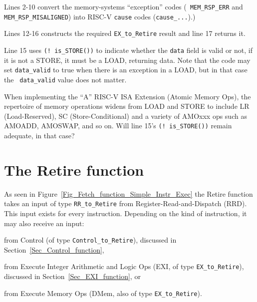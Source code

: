 Lines 2-10 convert the memory-systems ``exception'' codes ({\tt
MEM\_RSP\_ERR} and {\tt MEM\_RSP\_MISALIGNED}) into RISC-V {\tt cause}
codes ({\tt cause\_...}).)

Lines 12-16 constructs the required {\tt EX\_to\_Retire} result and
line 17 returns it.

Line 15 uses {\tt (!~is\_STORE())} to indicate whether the {\tt data}
field is valid or not, {\ie} if it is not a STORE, it must be a LOAD,
returning data.  Note that the code may set {\tt data\_valid} to true
when there is an exception in a LOAD, but in that case the {\tt
data\_valid} value does not matter.

\hdivider

\Exercise

When implementing the ``A'' RISC-V ISA Extension (Atomic Memory Ops),
the repertoire of memory operations widens from LOAD and STORE to
include LR (Load-Reserved), SC (Store-Conditional) and a variety of
AMOxxx ops such as AMOADD, AMOSWAP, and so on.
Will line 15's {\tt (!~is\_STORE())} remain adequate, in that case?

\Endexercise


\section{The Retire function}

\label{Sec_Retire_function}


As seen in Figure~\ref{Fig_Fetch_function_Simple_Instr_Exec} the
Retire function takes an input of type \verb|RR_to_Retire| from
Register-Read-and-Dispatch (RRD).  This input exists for every
instruction.  Depending on the kind of instruction, it may also
receive an input:

\begin{tightlist}

  \item from Control (of type \verb|Control_to_Retire|), discussed in
    Section~\ref{Sec_Control_function},

  \item from Execute Integer Arithmetic and Logic Ops (EXI, of type
    \verb|EX_to_Retire|), discussed in Section~\ref{Sec_EXI_function},
    or

  \item from Execute Memory Ops (DMem, also of type
    \verb|EX_to_Retire|).

\end{tightlist}

